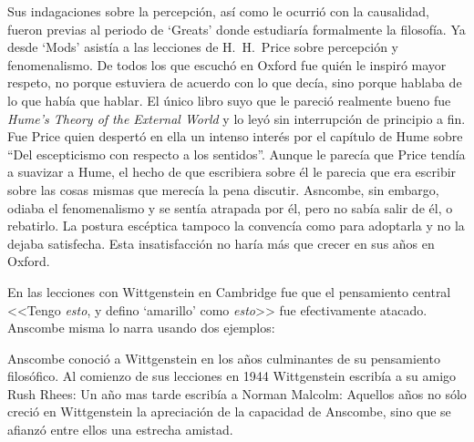 Sus indagaciones sobre la percepción, así como le ocurrió con la causalidad,
fueron previas al periodo de `Greats' donde estudiaría formalmente la filosofía.
Ya desde `Mods' asistía a las lecciones de H.~H.~Price sobre percepción y
fenomenalismo. De todos los que escuchó en Oxford fue quién le inspiró mayor
respeto, no porque estuviera de acuerdo con lo que decía, sino porque hablaba de
lo que había que hablar. El único libro suyo que le pareció realmente bueno fue
\emph{Hume's Theory of the External World} y lo leyó sin interrupción de
principio a fin. Fue Price quien despertó en ella un intenso interés por el
capítulo de Hume sobre ``Del escepticismo con respecto a los sentidos''. Aunque
le parecía que Price tendía a suavizar a Hume, el hecho de que escribiera sobre
él le parecia que era escribir sobre las cosas mismas que merecía la pena
discutir. Asncombe, sin embargo, odiaba el fenomenalismo y se sentía atrapada
por él, pero no sabía salir de él, o rebatirlo. La postura escéptica tampoco la
convencía como para adoptarla y no la dejaba satisfecha. Esta insatisfacción no
haría más que crecer en sus años en Oxford.
\autocites[cf.~][p.~viii]{anscombe1981metaphysicsintro}
[~y~][p.~26]{torralba2005accion}


En las lecciones con Wittgenstein en Cambridge fue que el pensamiento central
<<Tengo \emph{esto}, y defino `amarillo' como \emph{esto}>> fue efectivamente
atacado. Anscombe misma lo narra usando dos ejemplos:

Anscombe conoció a Wittgenstein en los años culminantes de su pensamiento
     filosófico.
     Al comienzo de sus lecciones en 1944 Wittgenstein escribía a su amigo Rush Rhees:
     Un año mas tarde escribía a Norman Malcolm:
     Aquellos años no sólo creció en Wittgenstein la apreciación de la capacidad de
     Anscombe, sino que se afianzó entre ellos una estrecha amistad.

